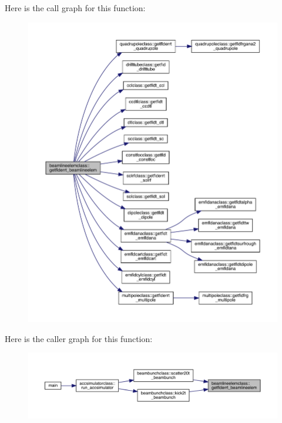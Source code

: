 Here is the call graph for this function\+:\nopagebreak
\begin{figure}[H]
\begin{center}
\leavevmode
\includegraphics[width=350pt]{namespacebeamlineelemclass_a7684dcfae71c895630dae0e95476e203_cgraph}
\end{center}
\end{figure}
Here is the caller graph for this function\+:\nopagebreak
\begin{figure}[H]
\begin{center}
\leavevmode
\includegraphics[width=350pt]{namespacebeamlineelemclass_a7684dcfae71c895630dae0e95476e203_icgraph}
\end{center}
\end{figure}
\mbox{\label{namespacebeamlineelemclass_a99175508a57a532d040552a0a72bdcc1}} 
